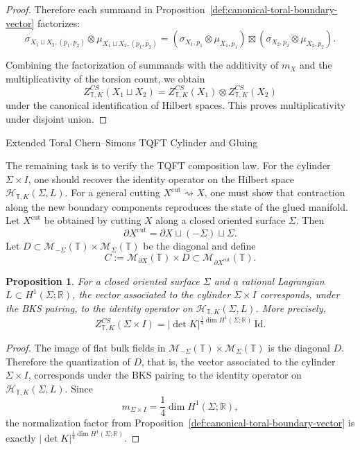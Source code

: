 \documentclass[12pt]{amsart}
\makeatletter
\renewcommand\section{\@startsection{section}{1}%
  \z@{.7\linespacing\@plus\linespacing}{.5\linespacing}%
  {\normalfont\bfseries\centering}}
\renewcommand\subsection{\@startsection{subsection}{2}%
  \z@{.5\linespacing\@plus.7\linespacing}{-.5em}%
  {\normalfont\bfseries}}
\numberwithin{equation}{section}
\newtheorem{prop}[theorem]{Proposition}
\makeatother
\begin{document}
\begin{proof}
Therefore each summand in Proposition~\ref{def:canonical-toral-boundary-vector} factorizes:
\[
\sigma_{X_1\sqcup X_2,(p_1,p_2)}\otimes
\mu_{X_1\sqcup X_2,(p_1,p_2)}
=
(\sigma_{X_1,p_1}\otimes \mu_{X_1,p_1})
\boxtimes
(\sigma_{X_2,p_2}\otimes \mu_{X_2,p_2}).
\]

Combining the factorization of summands with the additivity of $m_X$ and the multiplicativity of the
torsion count, we obtain
\[
Z^{CS}_{\mathbb T,K}(X_1\sqcup X_2)
=
Z^{CS}_{\mathbb T,K}(X_1)\otimes Z^{CS}_{\mathbb T,K}(X_2)
\]
under the canonical identification of Hilbert spaces. This proves multiplicativity under disjoint union.
\end{proof}

\section{\texorpdfstring{Extended Toral Chern–Simons TQFT}{ Extended Toral Chern–Simons TQFT}}
\subsection{Cylinder and Gluing}

The remaining task is to verify the TQFT composition law. For the cylinder \(\Sigma\times I\), one should recover the identity operator on the Hilbert
space \(\mathcal H_{\mathbb T,K}(\Sigma,L)\). For a general cutting \(X^{\mathrm{cut}}\rightsquigarrow X\), one must show that contraction along the new boundary components reproduces the state of the glued manifold. Let $X^{\mathrm{cut}}$ be obtained by cutting $X$ along a closed oriented surface $\Sigma$.
Then
\[
\partial X^{\mathrm{cut}}
=
\partial X\sqcup(-\Sigma)\sqcup \Sigma.
\]
Let $D\subset \mathcal M_{-\Sigma}(\mathbb T)\times \mathcal M_\Sigma(\mathbb T)$ be the diagonal and define
\[
C:=\mathcal M_{\partial X}(\mathbb T)\times D
\subset
\mathcal M_{\partial X^{\mathrm{cut}}}(\mathbb T).
\]

\begin{prop}
\label{prop:toral-cylinder-kernel}
For a closed oriented surface $\Sigma$ and a rational Lagrangian
$L\subset H^1(\Sigma;\mathbb R)$, the vector associated to the cylinder
$\Sigma\times I$ corresponds, under the BKS pairing, to the identity
operator on $\mathcal H_{\mathbb T,K}(\Sigma,L)$. More precisely,
\[
Z^{CS}_{\mathbb T,K}(\Sigma\times I)
=
|\det K|^{\frac14\dim H^1(\Sigma;\mathbb R)}\,\mathrm{Id}.
\]
\end{prop}

\begin{proof}
The image of flat bulk fields in
$\mathcal M_{-\Sigma}(\mathbb T)\times \mathcal M_\Sigma(\mathbb T)$
is the diagonal $D$. Therefore the quantization of $D$, that is, the
vector associated to the cylinder $\Sigma\times I$, corresponds under
the BKS pairing to the identity operator on
$\mathcal H_{\mathbb T,K}(\Sigma,L)$.
Since
\[
m_{\Sigma\times I}
=
\frac14\dim H^1(\Sigma;\mathbb R),
\]
the normalization factor from
Proposition~\ref{def:canonical-toral-boundary-vector}
is exactly $|\det K|^{\frac14\dim H^1(\Sigma;\mathbb R)}$.
\end{proof}
\end{document}

